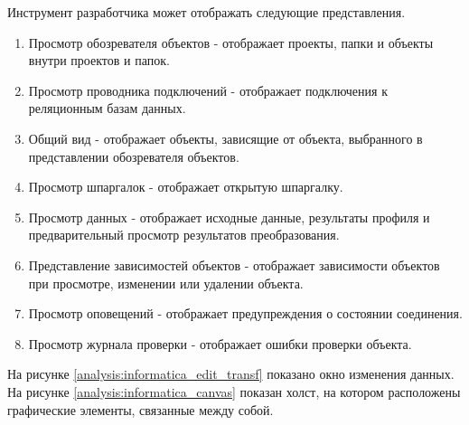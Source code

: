 Инструмент разработчика может отображать следующие представления.
\begin{enumerate}
   \item Просмотр обозревателя объектов - отображает проекты, папки и объекты внутри проектов и папок.
   \item Просмотр проводника подключений - отображает подключения к реляционным базам данных.
   \item Общий вид - отображает объекты, зависящие от объекта, выбранного в представлении обозревателя объектов.
   \item Просмотр шпаргалок -  отображает открытую шпаргалку.
   \item Просмотр данных - отображает исходные данные, результаты профиля и предварительный просмотр результатов преобразования. 
   \item Представление зависимостей объектов - отображает зависимости объектов при просмотре, изменении или удалении объекта.
   \item Просмотр оповещений - отображает предупреждения о состоянии соединения.
   \item Просмотр журнала проверки - отображает ошибки проверки объекта.
\end{enumerate}

На рисунке \ref{analysis:informatica_edit_transf} показано окно изменения данных. 
На рисунке \ref{analysis:informatica_canvas} показан холст, на котором расположены графические 
элементы, связанные между собой. 

\begin{figure}[ht!]
\end{figure}

